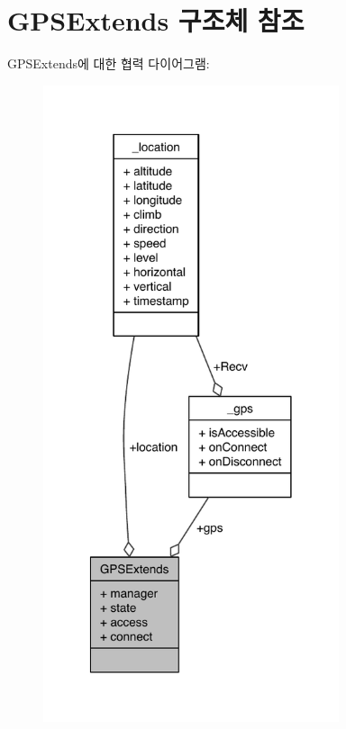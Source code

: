 \hypertarget{struct_g_p_s_extends}{\section{G\-P\-S\-Extends 구조체 참조}
\label{struct_g_p_s_extends}
}


G\-P\-S\-Extends에 대한 협력 다이어그램\-:\nopagebreak
\begin{figure}[H]
\begin{center}
\leavevmode
\includegraphics[width=246pt]{db/d85/struct_g_p_s_extends__coll__graph}
\end{center}
\end{figure}
